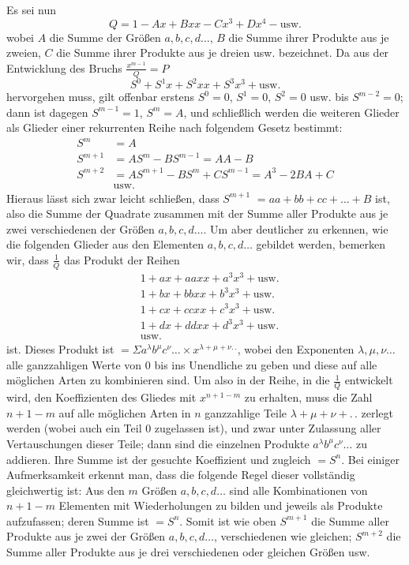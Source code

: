 Es sei nun
\[
Q=1-Ax+Bxx-Cx^3+Dx^4-\text{usw.}
\]
wobei $A$ die Summe der Größen $a,b,c,d\ldots$, $B$ die Summe ihrer Produkte aus je zweien, $C$ die Summe ihrer Produkte aus je dreien usw. bezeichnet. Da aus der Entwicklung des Bruchs $\frac{x^{m-1}}Q=P$
\[
S^0+S^1x+S^2xx+S^3x^3+\text{usw.}
\]
hervorgehen muss, gilt offenbar erstens $S^0=0$, $S^1=0$, $S^2=0$ usw. bis $S^{m-2}=0$; dann
ist dagegen $S^{m-1}=1$, $S^m=A$, und schließlich werden die weiteren Glieder als Glieder einer rekurrenten Reihe nach folgendem Gesetz bestimmt:
\[
\begin{aligned}
S^m&=A\\
S^{m+1}&=AS^m-BS^{m-1}=AA-B\\
S^{m+2}&=AS^{m+1}-BS^m+CS^{m-1}=A^3-2BA+C\\
&\text{usw.}
\end{aligned}
\]
Hieraus lässt sich zwar leicht schließen, dass $S^{m+1}$ $=aa+bb+cc+\ldots+B$ ist, also die Summe der Quadrate zusammen mit der Summe aller Produkte aus je zwei verschiedenen der Größen $a,b,c,d\ldots$. Um aber deutlicher zu erkennen, wie die folgenden Glieder aus den Elementen $a,b,c,d\ldots$ gebildet werden, bemerken wir, dass $\frac1Q$ das Produkt der Reihen
\[
\begin{aligned}
&1+ax+aaxx+a^3x^3+\text{usw.}\\
&1+bx+bbxx+b^3x^3+\text{usw.}\\
&1+cx+ccxx+c^3x^3+\text{usw.}\\
&1+dx+ddxx+d^3x^3+\text{usw.}\\
&\text{usw.}
\end{aligned}
\]
ist. Dieses Produkt ist $=\Sigma a^\lambda b^\mu c^\nu\ldots\times x^{\lambda+\mu+\nu.\,.}$, wobei den Exponenten $\lambda,\mu,\nu\ldots$ alle ganzzahligen Werte von 0 bis ins Unendliche zu geben und diese auf alle möglichen Arten zu kombinieren sind. Um also in der Reihe, in die $\frac1Q$ entwickelt wird, den Koeffizienten des Gliedes mit $x^{n+1-m}$ zu erhalten, muss die Zahl $n+1-m$ auf alle möglichen Arten in $n$ ganzzahlige Teile $\lambda+\mu+\nu+.\,.$ zerlegt werden (wobei auch ein Teil 0 zugelassen ist), und zwar unter Zulassung aller Vertauschungen dieser Teile; dann sind die einzelnen Produkte $a^\lambda b^\mu c^\nu\ldots$ zu addieren. Ihre Summe ist der gesuchte Koeffizient und zugleich $=S^n$. Bei einiger Aufmerksamkeit erkennt man, dass die folgende Regel dieser vollständig gleichwertig ist: Aus den $m$ Größen $a,b,c,d\ldots$ sind alle Kombinationen von $n+1-m$ Elementen mit Wiederholungen zu bilden und jeweils als Produkte aufzufassen; deren Summe ist $=S^n$. Somit ist wie oben $S^{m+1}$ die Summe aller Produkte aus je zwei der Größen $a,b,c,d\ldots$, verschiedenen wie gleichen; $S^{m+2}$ die Summe aller Produkte aus je drei verschiedenen oder gleichen Größen usw.

